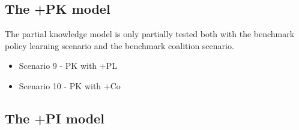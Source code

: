 \documentclass[12pt]{article}
\begin{document}
\subsection{The +PK model}

The partial knowledge model is only partially tested both with the benchmark policy learning scenario and the benchmark coalition scenario.

\begin{itemize}
\item Scenario 9 - PK with +PL
\item Scenario 10 - PK with +Co
\end{itemize}

\subsection{The +PI model}

\end{document}
